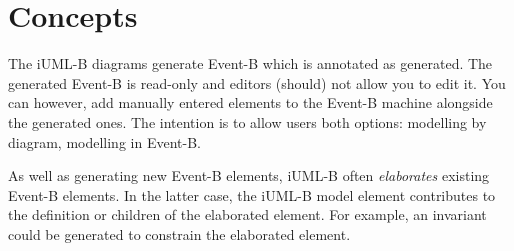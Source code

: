 \section{Concepts}
\label{sec:iumlb-concepts}

The iUML-B diagrams generate Event-B which is annotated as generated.
The generated Event-B is read-only and editors (should) not allow you to edit it.
You can however, add manually entered elements to the Event-B machine alongside the generated ones.
The intention is to allow users both options: modelling by diagram, modelling in Event-B.

As well as generating new Event-B elements, iUML-B often \emph{elaborates} existing Event-B elements.
In the latter case, the iUML-B model element contributes to the definition or children of the elaborated element.
For example, an invariant could be generated to constrain the elaborated element.

